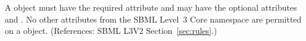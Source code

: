 A \RateRule object must have the required attribute  and
may have the optional attributes   and .  No
other attributes from the SBML Level~3 Core namespace are permitted on a
\RateRule object.  (References: SBML L3V2 Section~\ref{sec:rules}.)
